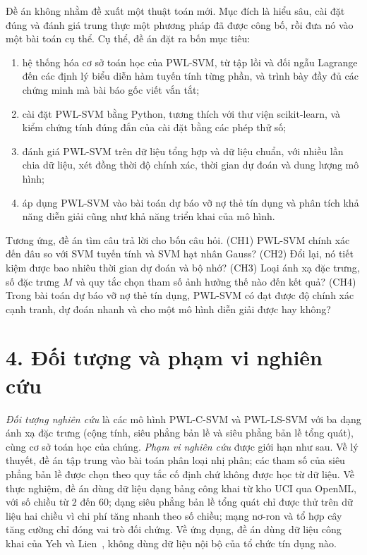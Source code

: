 Đề án không nhằm đề xuất một thuật toán mới. Mục đích là hiểu sâu, cài đặt đúng và đánh giá trung thực một phương pháp đã được công bố, rồi đưa nó vào một bài toán cụ thể. Cụ thể, đề án đặt ra bốn mục tiêu:
\begin{enumerate}[label=(\roman*)]
\item hệ thống hóa cơ sở toán học của PWL-SVM, từ tập lồi và đối ngẫu Lagrange đến các định lý biểu diễn hàm tuyến tính từng phần, và trình bày đầy đủ các chứng minh mà bài báo gốc viết vắn tắt;
\item cài đặt PWL-SVM bằng Python, tương thích với thư viện scikit-learn, và kiểm chứng tính đúng đắn của cài đặt bằng các phép thử số;
\item đánh giá PWL-SVM trên dữ liệu tổng hợp và dữ liệu chuẩn, với nhiều lần chia dữ liệu, xét đồng thời độ chính xác, thời gian dự đoán và dung lượng mô hình;
\item áp dụng PWL-SVM vào bài toán dự báo vỡ nợ thẻ tín dụng và phân tích khả năng diễn giải cũng như khả năng triển khai của mô hình.
\end{enumerate}
Tương ứng, đề án tìm câu trả lời cho bốn câu hỏi. (CH1) PWL-SVM chính xác đến đâu so với SVM tuyến tính và SVM hạt nhân Gauss? (CH2) Đổi lại, nó tiết kiệm được bao nhiêu thời gian dự đoán và bộ nhớ? (CH3) Loại ánh xạ đặc trưng, số đặc trưng $M$ và quy tắc chọn tham số ảnh hưởng thế nào đến kết quả? (CH4) Trong bài toán dự báo vỡ nợ thẻ tín dụng, PWL-SVM có đạt được độ chính xác cạnh tranh, dự đoán nhanh và cho một mô hình diễn giải được hay không?

\section*{4. Đối tượng và phạm vi nghiên cứu}

\emph{Đối tượng nghiên cứu} là các mô hình PWL-C-SVM và PWL-LS-SVM với ba dạng ánh xạ đặc trưng (cộng tính, siêu phẳng bản lề và siêu phẳng bản lề tổng quát), cùng cơ sở toán học của chúng. \emph{Phạm vi nghiên cứu} được giới hạn như sau. Về lý thuyết, đề án tập trung vào bài toán phân loại nhị phân; các tham số của siêu phẳng bản lề được chọn theo quy tắc cố định chứ không được học từ dữ liệu. Về thực nghiệm, đề án dùng dữ liệu dạng bảng công khai từ kho UCI qua OpenML, với số chiều từ $2$ đến $60$; dạng siêu phẳng bản lề tổng quát chỉ được thử trên dữ liệu hai chiều vì chi phí tăng nhanh theo số chiều; mạng nơ-ron và tổ hợp cây tăng cường chỉ đóng vai trò đối chứng. Về ứng dụng, đề án dùng dữ liệu công khai của Yeh và Lien~\cite{yeh2009}, không dùng dữ liệu nội bộ của tổ chức tín dụng nào.

